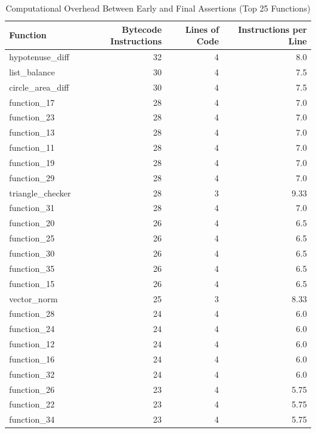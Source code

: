 \begin{table}[h]
\centering
\begin{tabular}{|l|r|r|r|}
\hline
Function & Bytecode Instructions & Lines of Code & Instructions per Line \\
\hline
hypotenuse_diff & 32 & 4 & 8.0 \\
list_balance & 30 & 4 & 7.5 \\
circle_area_diff & 30 & 4 & 7.5 \\
function_17 & 28 & 4 & 7.0 \\
function_23 & 28 & 4 & 7.0 \\
function_13 & 28 & 4 & 7.0 \\
function_11 & 28 & 4 & 7.0 \\
function_19 & 28 & 4 & 7.0 \\
function_29 & 28 & 4 & 7.0 \\
triangle_checker & 28 & 3 & 9.33 \\
function_31 & 28 & 4 & 7.0 \\
function_20 & 26 & 4 & 6.5 \\
function_25 & 26 & 4 & 6.5 \\
function_30 & 26 & 4 & 6.5 \\
function_35 & 26 & 4 & 6.5 \\
function_15 & 26 & 4 & 6.5 \\
vector_norm & 25 & 3 & 8.33 \\
function_28 & 24 & 4 & 6.0 \\
function_24 & 24 & 4 & 6.0 \\
function_12 & 24 & 4 & 6.0 \\
function_16 & 24 & 4 & 6.0 \\
function_32 & 24 & 4 & 6.0 \\
function_26 & 23 & 4 & 5.75 \\
function_22 & 23 & 4 & 5.75 \\
function_34 & 23 & 4 & 5.75 \\
\hline
\end{tabular}
\caption{Computational Overhead Between Early and Final Assertions (Top 25 Functions)}
\label{tab:computational_overhead}
\end{table}